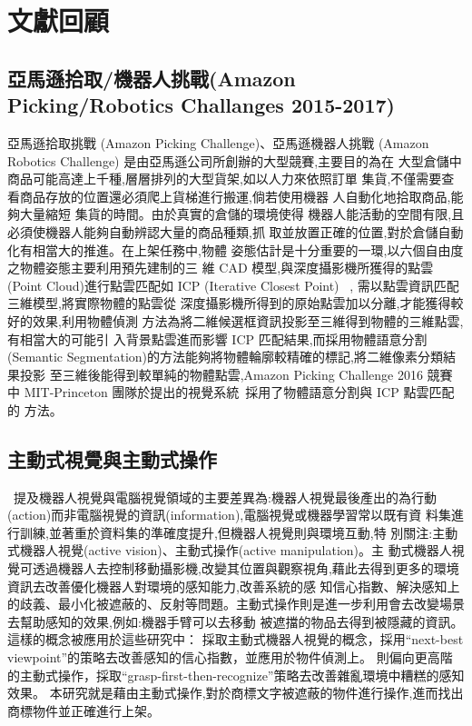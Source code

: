 \chapter{文獻回顧}
\label{chapter:relate-work}

\section{亞馬遜拾取/機器人挑戰(Amazon Picking/Robotics Challanges 2015-2017)}
亞馬遜拾取挑戰 (Amazon Picking Challenge)、亞馬遜機器人挑戰 (Amazon
Robotics Challenge) 是由亞馬遜公司所創辦的大型競賽,主要目的為在
大型倉儲中商品可能高達上千種,層層排列的大型貨架,如以人力來依照訂單
集貨,不僅需要查看商品存放的位置還必須爬上貨梯進行搬運,倘若使用機器
人自動化地拾取商品,能夠大量縮短 集貨的時間。由於真實的倉儲的環境使得
機器人能活動的空間有限,且必須使機器人能夠自動辨認大量的商品種類,抓
取並放置正確的位置,對於倉儲自動化有相當大的推進。在上架任務中,物體
姿態估計是十分重要的一環,以六個自由度之物體姿態主要利用預先建制的三
維 CAD 模型,與深度攝影機所獲得的點雲(Point Cloud)進行點雲匹配如 ICP
(Iterative Closest Point) ~\cite{pomerleau2013comparing},
需以點雲資訊匹配三維模型,將實際物體的點雲從
深度攝影機所得到的原始點雲加以分離,才能獲得較好的效果,利用物體偵測
方法為將二維候選框資訊投影至三維得到物體的三維點雲,有相當大的可能引
入背景點雲進而影響 ICP 匹配結果,而採用物體語意分割(Semantic
Segmentation)的方法能夠將物體輪廓較精確的標記,將二維像素分類結果投影
至三維後能得到較單純的物體點雲,Amazon Picking Challenge 2016 競賽中
MIT-Princeton 團隊於提出的視覺系統~\cite{zeng2016multi}採用了物體語意分割與 ICP 點雲匹配的
方法。

\section{主動式視覺與主動式操作}
~\cite{sunderhauf2018limits}提及機器人視覺與電腦視覺領域的主要差異為:機器人視覺最後產出的為行動
(action)而非電腦視覺的資訊(information),電腦視覺或機器學習常以既有資
料集進行訓練,並著重於資料集的準確度提升,但機器人視覺則與環境互動,特
別關注:主動式機器人視覺(active vision)、主動式操作(active manipulation)。主
動式機器人視覺可透過機器人去控制移動攝影機,改變其位置與觀察視角,藉此去得到更多的環境資訊去改善優化機器人對環境的感知能力,改善系統的感
知信心指數、解決感知上的歧義、最小化被遮蔽的、反射等問題。主動式操作則是進一步利用會去改變場景去幫助感知的效果,例如:機器手臂可以去移動
被遮擋的物品去得到被隱藏的資訊。
這樣的概念被應用於這些研究中： \cite{atanasov2014nonmyopic} \cite{doumanoglou2016recovering} \cite{malmir2017deep}採取主動式機器人視覺的概念，採用``next-best viewpoint''的策略去改善感知的信心指數，並應用於物件偵測上。
 \cite{zeng2018robotic} 則偏向更高階的主動式操作，採取``grasp-first-then-recognize''策略去改善雜亂環境中糟糕的感知效果。
本研究就是藉由主動式操作,對於商標文字被遮蔽的物件進行操作,進而找出商標物件並正確進行上架。



